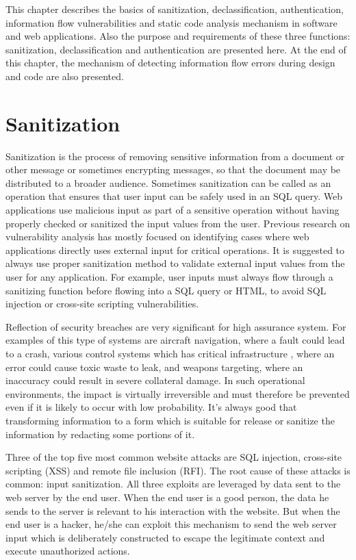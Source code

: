 This chapter describes the basics of sanitization, declassification, authentication, information flow vulnerabilities and static code analysis mechanism in software and web applications. Also the purpose and requirements of these three functions: sanitization, declassification and authentication are presented here. At the end of this chapter, the mechanism of detecting information flow errors during design and code are also presented.

\section{Sanitization}
Sanitization is the process of removing sensitive information from a document or other message or sometimes encrypting messages, so that the document may be distributed to a broader audience. Sometimes sanitization can be called as an operation that ensures that user input can be safely used in an SQL query. Web applications use malicious input as part of a sensitive operation without having properly checked or sanitized the input values from the user. Previous research on vulnerability analysis has mostly focused on identifying cases where web applications directly uses external input for critical operations. It is suggested to always use proper sanitization method to validate external input values from the user for any application. For example, user inputs must always flow through a sanitizing function before flowing into a SQL query or HTML, to avoid SQL injection or cross-site scripting vulnerabilities.

Reflection of security breaches are very significant for high assurance system. For examples of this type of systems are aircraft navigation, where a fault could lead to a crash, various control systems which has critical infrastructure , where an error 
could cause toxic waste to leak, and weapons targeting, where an inaccuracy could result in severe collateral damage. In such
operational environments, the impact is virtually irreversible and must therefore be prevented even if it is likely to occur
with low probability. It's always good that transforming information to a form which is suitable for release or sanitize the information by redacting some portions of it.

Three of the top five most common website attacks are SQL injection, cross-site scripting (XSS) and remote file inclusion (RFI). The root cause of these attacks is common: input sanitization. All three exploits are leveraged by data sent to the web server by the end user. When the end user is a good person, the data he sends to the server is relevant to his interaction with the website. But when the end user is a hacker, he/she can exploit this mechanism to send the web server input which is deliberately constructed to escape the legitimate context and execute unauthorized actions.

